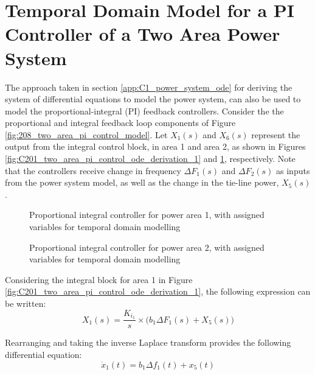 \section{Temporal Domain Model for a PI Controller of a Two Area Power System} \label{sec:temporal_domain_for_pi_controller}

The approach taken in section \ref{app:C1_power_system_ode} for deriving the system of differential equations to model the power system, can also be used to model the proportional-integral (PI) feedback controllers. Consider the the proportional and integral feedback loop components of Figure \ref{fig:208_two_area_pi_control_model}. Let $X_1(s)$ and $X_6(s)$ represent the output from the integral control block, in area 1 and area 2, as shown in Figures \ref{fig:C201_two_area_pi_control_ode_derivation_1} and \ref{fig:C202_two_area_pi_control_ode_derivation_2}, respectively. Note that the controllers receive change in frequency $\Delta F_1(s)$ and $\Delta F_2(s)$ as inputs from the power system model, as well as the change in the tie-line power, $X_5(s)$.

\begin{figure}[h]
	\begin{minipage}[b]{0.5\textwidth}
		\resizebox{7.0cm}{!}{}
		\caption{Proportional integral controller for power area 1, with assigned variables for temporal domain modelling}
		\label{fig:C201_two_area_pi_control_ode_derivation_1}
	\end{minipage}
	\hspace{0.1cm}
	\begin{minipage}[b]{0.5\textwidth}
		\resizebox{7.2cm}{!}{}
		\caption{Proportional integral controller for power area 2, with assigned variables for temporal domain modelling}
		\label{fig:C202_two_area_pi_control_ode_derivation_2}
	\end{minipage}
\end{figure}

Considering the integral block for area 1 in Figure \ref{fig:C201_two_area_pi_control_ode_derivation_1}, the following expression can be written:
\begin{equation}
	X_1(s) = \frac{K_{i_1}}{s} \times \big( b_1 \Delta F_1(s) + X_5(s) \big) \label{eq:C201}
\end{equation}

Rearranging and taking the inverse Laplace transform provides the following differential equation:
\begin{equation}
	\dot{x}_1(t) = b_1 \Delta f_1(t) + x_5(t) \label{eq:C202}
\end{equation}

